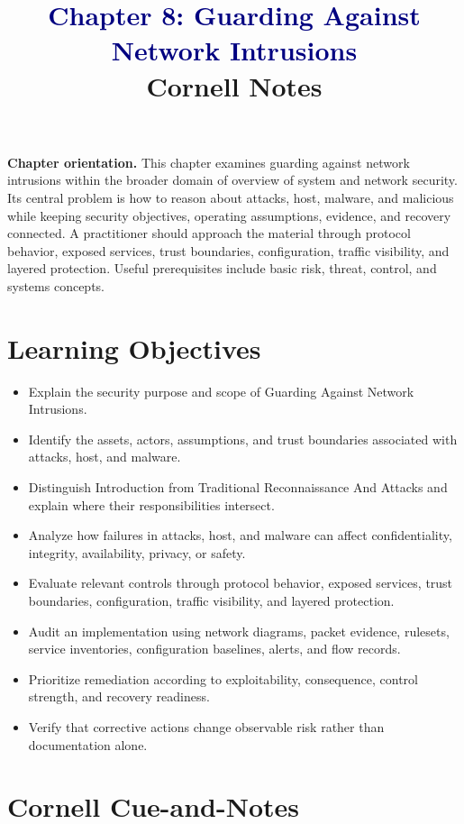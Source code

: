 \documentclass[11pt]{article}
\title{\textcolor{Navy}{Chapter 8: Guarding Against Network Intrusions}\\[2mm]\large Cornell Notes}
\author{}
\date{}
\begin{document}
\maketitle
\thispagestyle{fancy}
\vspace{-1.5em}
\begin{orientationbox}
\textbf{Chapter orientation.} This chapter examines guarding against network intrusions within the broader domain of overview of system and network security. Its central problem is how to reason about attacks, host, malware, and malicious while keeping security objectives, operating assumptions, evidence, and recovery connected. A practitioner should approach the material through protocol behavior, exposed services, trust boundaries, configuration, traffic visibility, and layered protection. Useful prerequisites include basic risk, threat, control, and systems concepts.
\end{orientationbox}
\section*{Learning Objectives}
\begin{itemize}
\item Explain the security purpose and scope of Guarding Against Network Intrusions.
\item Identify the assets, actors, assumptions, and trust boundaries associated with attacks, host, and malware.
\item Distinguish Introduction from Traditional Reconnaissance And Attacks and explain where their responsibilities intersect.
\item Analyze how failures in attacks, host, and malware can affect confidentiality, integrity, availability, privacy, or safety.
\item Evaluate relevant controls through protocol behavior, exposed services, trust boundaries, configuration, traffic visibility, and layered protection.
\item Audit an implementation using network diagrams, packet evidence, rulesets, service inventories, configuration baselines, alerts, and flow records.
\item Prioritize remediation according to exploitability, consequence, control strength, and recovery readiness.
\item Verify that corrective actions change observable risk rather than documentation alone.
\end{itemize}
\section*{Cornell Cue-and-Notes}
\end{document}
